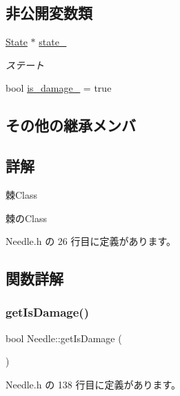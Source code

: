 \subsection*{非公開変数類}
\begin{DoxyCompactItemize}
\item 
\mbox{\hyperlink{class_needle_1_1_state}{State}} $\ast$ \mbox{\hyperlink{class_needle_a9ece23f3ee2e844aee7dbbe8d8110218}{state\+\_\+}}
\begin{DoxyCompactList}\small\item\em ステート \end{DoxyCompactList}\item 
bool \mbox{\hyperlink{class_needle_a311dfd4f4dacea81fbd194150b75a946}{is\+\_\+damage\+\_\+}} = true
\end{DoxyCompactItemize}
\subsection*{その他の継承メンバ}


\subsection{詳解}
棘\+Class 

棘の\+Class 

 Needle.\+h の 26 行目に定義があります。



\subsection{関数詳解}
\mbox{\label{class_needle_aabdce3968b99467237da733a262b00f0}} 
\subsubsection{\texorpdfstring{get\+Is\+Damage()}{getIsDamage()}}
{\footnotesize\ttfamily bool Needle\+::get\+Is\+Damage (\begin{DoxyParamCaption}{ }\end{DoxyParamCaption})\hspace{0.3cm}{\ttfamily [inline]}}



 Needle.\+h の 138 行目に定義があります。

\mbox{\label{class_needle_a3b0e0e86944e85bfb283de011c7ce8a2}} 
